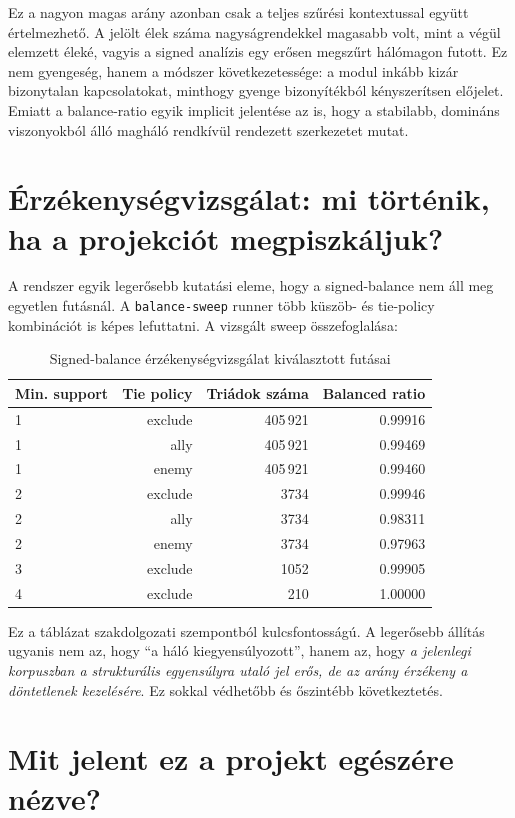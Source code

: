 \documentclass[a4paper,12pt]{report}
\begin{document}
Ez a nagyon magas arány azonban csak a teljes szűrési kontextussal együtt értelmezhető. A jelölt élek száma nagyságrendekkel magasabb volt, mint a végül elemzett éleké, vagyis a signed analízis egy erősen megszűrt hálómagon futott. Ez nem gyengeség, hanem a módszer következetessége: a modul inkább kizár bizonytalan kapcsolatokat, minthogy gyenge bizonyítékból kényszerítsen előjelet. Emiatt a balance-ratio egyik implicit jelentése az is, hogy a stabilabb, domináns viszonyokból álló magháló rendkívül rendezett szerkezetet mutat.

\section{Érzékenységvizsgálat: mi történik, ha a projekciót megpiszkáljuk?}

A rendszer egyik legerősebb kutatási eleme, hogy a signed-balance nem áll meg egyetlen futásnál. A \texttt{balance-sweep} runner több küszöb- és tie-policy kombinációt is képes lefuttatni. A vizsgált sweep összefoglalása:

\begin{table}[H]
\centering
\caption{Signed-balance érzékenységvizsgálat kiválasztott futásai}
\begin{tabular}{lrrr}
\toprule
\textbf{Min. support} & \textbf{Tie policy} & \textbf{Triádok száma} & \textbf{Balanced ratio} \\
\midrule
1 & exclude & 405\,921 & 0.99916 \\
1 & ally & 405\,921 & 0.99469 \\
1 & enemy & 405\,921 & 0.99460 \\
2 & exclude & 3734 & 0.99946 \\
2 & ally & 3734 & 0.98311 \\
2 & enemy & 3734 & 0.97963 \\
3 & exclude & 1052 & 0.99905 \\
4 & exclude & 210 & 1.00000 \\
\bottomrule
\end{tabular}
\end{table}

Ez a táblázat szakdolgozati szempontból kulcsfontosságú. A legerősebb állítás ugyanis nem az, hogy ``a háló kiegyensúlyozott'', hanem az, hogy \emph{a jelenlegi korpuszban a strukturális egyensúlyra utaló jel erős, de az arány érzékeny a döntetlenek kezelésére}. Ez sokkal védhetőbb és őszintébb következtetés.

\section{Mit jelent ez a projekt egészére nézve?}
\end{document}
